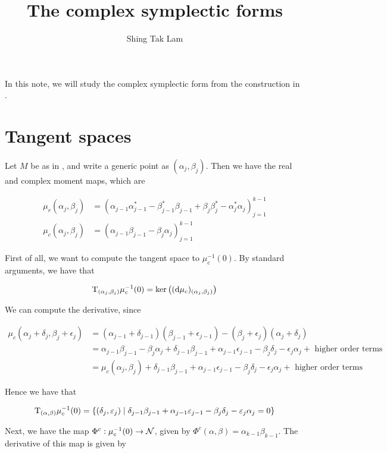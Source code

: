\documentclass{article}
\title{The complex symplectic forms}
\author{Shing Tak Lam}
\begin{document}
\maketitle

In this note, we will study the complex symplectic form from the construction in \cite{kobak_classical_1996}.

\section{Tangent spaces}

Let \(M\) be as in \cite{kobak_classical_1996}, and write a generic point as \((\alpha_j, \beta_j)\). Then we have the real and complex moment maps, which are

\begin{align*}
    \mu_r(\alpha_j, \beta_j) &= (\alpha_{j-1}\alpha_{j-1}^* - \beta_{j-1}^*\beta_{j-1}+\beta_j\beta_j^* - \alpha_j^*\alpha_j)_{j=1}^{k-1} \\
    \mu_c(\alpha_j, \beta_j) &= (\alpha_{j-1}\beta_{j-1} - \beta_j\alpha_j)_{j=1}^{k-1}
\end{align*}

First of all, we want to compute the tangent space to \(\mu_c^{-1}(0)\). By standard arguments, we have that

\[\mathrm{T}_{(\alpha_j, \beta_j)}\mu_c^{-1}(0) = \ker\left((\dd\mu_c)_{(\alpha_j, \beta_j)}\right)\]

We can compute the derivative, since

\begin{align*}
    \mu_c(\alpha_j + \delta_j, \beta_j + \epsilon_j) &= (\alpha_{j-1} + \delta_{j-1})(\beta_{j-1} + \epsilon_{j-1}) - (\beta_j + \epsilon_j)(\alpha_j + \delta_j) \\
    &= \alpha_{j-1}\beta_{j-1} - \beta_j\alpha_j + \delta_{j-1}\beta_{j-1} + \alpha_{j-1}\epsilon_{j-1} - \beta_j\delta_j - \epsilon_j\alpha_j + \text{ higher order terms}\\
    &= \mu_c(\alpha_j, \beta_j) + \delta_{j-1}\beta_{j-1} + \alpha_{j-1}\epsilon_{j-1} - \beta_j\delta_j - \epsilon_j\alpha_j + \text{ higher order terms}
\end{align*}

Hence we have that

\[\mathrm{T}_{(\alpha, \beta)}\mu_c^{-1}(0) = \left\{(\delta_j, \varepsilon_j) \mid \delta_{j-1}\beta_{j-1} + \alpha_{j-1}\varepsilon_{j-1} - \beta_j\delta_j - \varepsilon_j\alpha_j = 0\right\}\]

Next, we have the map \(\Phi^c : \mu_c^{-1}(0) \to \mathcal{N}\), given by \(\Phi^c(\alpha, \beta) = \alpha_{k-1}\beta_{k-1}\). The derivative of this map is given by
\end{document}
